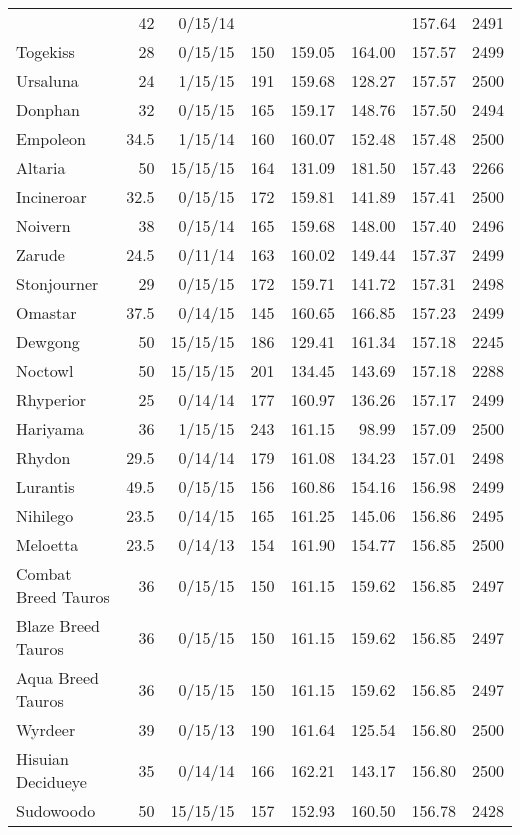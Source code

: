 \begin{longtable}{lrrrrrrr}
 & 42 & 0/15/14 & & & & 157.64 & 2491\\
Togekiss & 28 & 0/15/15 & 150 & 159.05 & 164.00 & 157.57 & 2499\\
Ursaluna & 24 & 1/15/15 & 191 & 159.68 & 128.27 & 157.57 & 2500\\
Donphan & 32 & 0/15/15 & 165 & 159.17 & 148.76 & 157.50 & 2494\\
Empoleon & 34.5 & 1/15/14 & 160 & 160.07 & 152.48 & 157.48 & 2500\\
Altaria & 50 & 15/15/15 & 164 & 131.09 & 181.50 & 157.43 & 2266\\
Incineroar & 32.5 & 0/15/15 & 172 & 159.81 & 141.89 & 157.41 & 2500\\
Noivern & 38 & 0/15/14 & 165 & 159.68 & 148.00 & 157.40 & 2496\\
Zarude & 24.5 & 0/11/14 & 163 & 160.02 & 149.44 & 157.37 & 2499\\
Stonjourner & 29 & 0/15/15 & 172 & 159.71 & 141.72 & 157.31 & 2498\\
Omastar & 37.5 & 0/14/15 & 145 & 160.65 & 166.85 & 157.23 & 2499\\
Dewgong & 50 & 15/15/15 & 186 & 129.41 & 161.34 & 157.18 & 2245\\
Noctowl & 50 & 15/15/15 & 201 & 134.45 & 143.69 & 157.18 & 2288\\
Rhyperior & 25 & 0/14/14 & 177 & 160.97 & 136.26 & 157.17 & 2499\\
Hariyama & 36 & 1/15/15 & 243 & 161.15 & 98.99 & 157.09 & 2500\\
Rhydon & 29.5 & 0/14/14 & 179 & 161.08 & 134.23 & 157.01 & 2498\\
Lurantis & 49.5 & 0/15/15 & 156 & 160.86 & 154.16 & 156.98 & 2499\\
Nihilego & 23.5 & 0/14/15 & 165 & 161.25 & 145.06 & 156.86 & 2495\\
Meloetta & 23.5 & 0/14/13 & 154 & 161.90 & 154.77 & 156.85 & 2500\\
Combat Breed Tauros & 36 & 0/15/15 & 150 & 161.15 & 159.62 & 156.85 & 2497\\
Blaze Breed Tauros & 36 & 0/15/15 & 150 & 161.15 & 159.62 & 156.85 & 2497\\
Aqua Breed Tauros & 36 & 0/15/15 & 150 & 161.15 & 159.62 & 156.85 & 2497\\
Wyrdeer & 39 & 0/15/13 & 190 & 161.64 & 125.54 & 156.80 & 2500\\
Hisuian Decidueye & 35 & 0/14/14 & 166 & 162.21 & 143.17 & 156.80 & 2500\\
Sudowoodo & 50 & 15/15/15 & 157 & 152.93 & 160.50 & 156.78 & 2428\\

\end{longtable}
